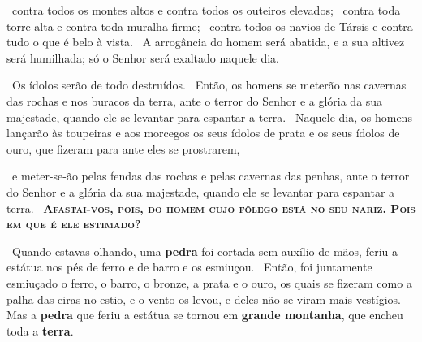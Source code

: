 \documentclass[12pt,aspectratio=169]{beamer}
\newcommand{\ver}[1]{%
    \raisebox{0.50ex}{%
        \scalebox{1.1}{%
            \pmb{\textbf{\textcolor{BSpbg}{#1}}}%
        }%
    }%
}
\newcommand{\QUOTE}[1]{%
    \par\noindent\hspace*{0.1\linewidth}%
    \begin{minipage}{0.8\linewidth}%
        \linespread{1.35}\large{#1}%
    \end{minipage}%
}
\newcommand{\RED}[1]{{\textcolor{TXred}{#1}}}
\newcommand{\ORA}[1]{{\textcolor{TXora}{#1}}}
\newcommand{\YEL}[1]{{\textcolor{TXyel}{#1}}}
\newcommand{\GRE}[1]{{\textcolor{TXgre}{#1}}}
\newcommand{\CYA}[1]{{\textcolor{TXcya}{#1}}}
\newcommand{\MAG}[1]{{\textcolor{TXmag}{#1}}}
\newcommand{\BRI}[1]{{\textcolor{BSpbg}{#1}}}   %
\begin{document}
    \begin{frame}
        \QUOTE{%
            \ver{(ARA) Is~2.14}~\RED{contra} todos os montes altos e \RED{contra}  todos  os
            outeiros elevados; \ver{15}~\RED{contra} toda torre  alta  e  \RED{contra}  toda
            muralha firme; \ver{16}~\RED{contra} todos os navios de  Társis  e  \RED{contra}
            tudo o que é belo à vista. \ver{17}~A arrogância do homem será abatida, e a  sua
            altivez será humilhada; \MAG{só o Senhor será exaltado naquele dia}.
        }
    \end{frame}

    \begin{frame}
        \QUOTE{%
            \ver{(ARA) Is~2.18}~Os \RED{ídolos serão de todo destruídos}. \ver{19}~Então, os
            homens se meterão nas cavernas das  rochas  e  nos  buracos  da  terra,  ante  o
            \MAG{terror do Senhor} e a \YEL{glória da sua majestade}, quando ele se levantar
            para \ORA{espantar  a  terra}.  \ver{20}~Naquele  dia,  os  homens  lançarão  às
            toupeiras e aos morcegos os seus \RED{ídolos} de prata e os seus \RED{ídolos} de
            ouro, que fizeram para ante eles se prostrarem,
        }
    \end{frame}

    \begin{frame}
        \QUOTE{%
            \ver{(ARA) Is~2.21}~e meter-se-ão pelas fendas das rochas e pelas  cavernas  das
            penhas, ante o \MAG{terror do Senhor} e a \YEL{glória da sua majestade},  quando
            ele       se       levantar       para       \ORA{espantar       a       terra}.
            \ver{22}~\textsc{\textbf{Afastai-vos, pois,  do  \BRI{homem}  cujo  \BRI{fôlego}
            está no seu \BRI{nariz}. Pois \RED{em que é ele estimado}?}}
        }
    \end{frame}

    \begin{frame}
        \QUOTE{%
            \ver{(ARA) Dn~2.34}~Quando estavas olhando, \GRE{uma \textbf{pedra}} foi cortada
            \GRE{sem auxílio de mãos}, \ORA{feriu} a estátua nos pés de ferro e de  barro  e
            os \ORA{esmiuçou}. \ver{35}~Então, foi juntamente esmiuçado o ferro, o barro,  o
            bronze, a prata e o ouro, os quais se fizeram como a palha das eiras no estio, e
            o  vento  os  levou,  e   deles   não   se   viram   mais   vestígios.   Mas   a
            \GRE{\textbf{pedra}} que  feriu  a  estátua  se  tornou  em  \GRE{\textbf{grande
            montanha}}, que \CYA{encheu toda a \textbf{terra}}.
        }
    \end{frame}
\end{document}

